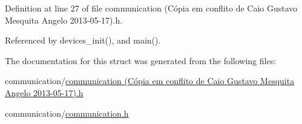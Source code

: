 Definition at line 27 of file communication (\-Cópia em conflito de Caio Gustavo Mesquita Angelo 2013-\/05-\/17).\-h.



Referenced by devices\-\_\-init(), and main().



The documentation for this struct was generated from the following files\-:\begin{DoxyCompactItemize}
\item 
communication/\hyperlink{communication_01_07C_xC3_xB3pia_01em_01conflito_01de_01Caio_01Gustavo_01Mesquita_01Angelo_012013-05-17_08_8h}{communication (\-Cópia em conflito de Caio Gustavo Mesquita Angelo 2013-\/05-\/17).\-h}\item 
communication/\hyperlink{communication_2communication_8h}{communication.\-h}\end{DoxyCompactItemize}

